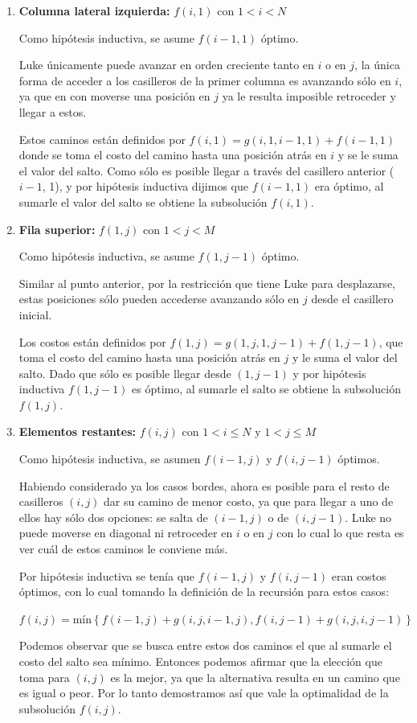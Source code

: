 	\begin{enumerate}
		\item{
			\textbf{Columna lateral izquierda: } $f(i, 1)$ con $1 < i < N$

			Como hipótesis inductiva, se asume $f(i - 1, 1)$ óptimo.

			Luke únicamente puede avanzar en orden creciente tanto en $i$
			o en $j$, la única forma de acceder a los casilleros de la primer
			columna es avanzando sólo en $i$, ya que en con moverse
			una posición en $j$ ya le resulta imposible retroceder y llegar a
			estos.

			Estos caminos están definidos por $f(i, 1) = g(i, 1, i - 1, 1) + f(i
			- 1, 1)$ donde se toma el costo del camino hasta una posición atrás
			en $i$ y se le suma el valor del salto. Como sólo es posible llegar
			a través del casillero anterior ($i - 1$, 1), y por hipótesis inductiva
			dijimos que $f(i - 1, 1)$ era óptimo, al sumarle el valor del salto
			se obtiene la subsolución $f(i, 1)$.
		}
		\item{
			\textbf{Fila superior: } $f(1, j)$ con $1 < j < M$

			Como hipótesis inductiva, se asume $f(1, j - 1)$ óptimo.

			Similar al punto anterior, por la restricción que tiene Luke para
			desplazarse, estas posiciones sólo pueden accederse avanzando sólo
			en $j$ desde el casillero inicial.

			Los costos están definidos por $f(1, j) = g(1, j, 1, j - 1) + f(1, j
			- 1)$, que toma el costo del camino hasta una posición atrás en $j$
			y le suma el valor del salto. Dado que sólo es posible llegar desde
			$(1, j - 1)$ y por hipótesis inductiva $f(1, j - 1)$ es óptimo, al
			sumarle el salto se obtiene la subsolución $f(1, j)$.
		}
		\item{
			\textbf{Elementos restantes: } $f(i, j)$ con $1 < i \leq N$ y $1 < j \leq M$

			Como hipótesis inductiva, se asumen $f(i - 1, j)$ y $f(i, j - 1)$
			óptimos.

			Habiendo considerado ya los casos bordes, ahora es posible para el
			resto de casilleros $(i, j)$ dar su camino de menor costo, ya que
			para llegar a uno de ellos hay sólo dos opciones: se salta de $(i -
			1, j)$ o de $(i, j - 1)$. Luke no puede moverse en diagonal ni
			retroceder en $i$ o en $j$ con lo cual lo que resta es ver cuál de
			estos caminos le conviene más.

			Por hipótesis inductiva se tenía que $f(i - 1, j)$ y $f(i, j - 1)$
			eran costos óptimos, con lo cual tomando la definición de la
			recursión para estos casos:

			$f(i, j) = \text{mín}\left \{ f(i - 1, j) + g(i, j, i - 1, j), f(i, j - 1) + g(i, j, i, j - 1) \right \}$

			Podemos observar que se busca entre estos dos caminos el que al
			sumarle el costo del salto sea mínimo. Entonces podemos afirmar que
			la elección que toma para $(i, j)$ es la mejor, ya que la
			alternativa resulta en un camino que es igual o peor. Por lo tanto
			demostramos así que vale la optimalidad de la subsolución $f(i, j)$.

		}
	\end{enumerate}

